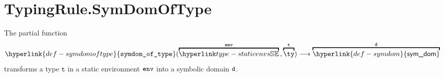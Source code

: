 \documentclass{book}
\newcommand\symdom[0]{\hyperlink{def-symdom}{\textsf{sym\_dom}}}
\newcommand\symdomoftype[0]{\hyperlink{def-symdomoftype}{\texttt{symdom\_of\_type}}}
\newcommand\vt[0]{\texttt{t}}
\begin{document}
\section{TypingRule.SymDomOfType}
\hypertarget{def-symdomoftype}{}
The partial function
\[
  \symdomoftype(\overname{\staticenvs}{\tenv} \aslsep \overname{\ty}{\vt}) \aslto \overname{\symdom}{\vd}
\]
transforms a type $\vt$ in a static environment $\texttt{env}$ into a symbolic domain $\texttt{d}$.

\end{document}
